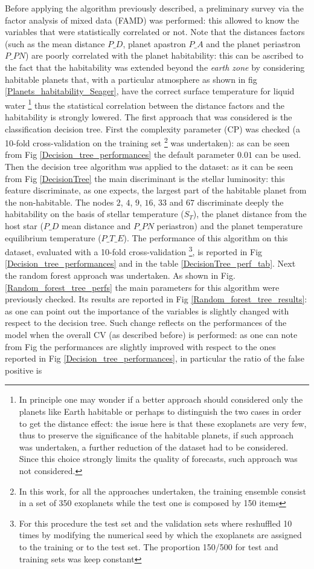 \documentclass[
12pt, %
a4paper, %
oneside, %
headinclude,footinclude, %
BCOR5mm, %
]{scrartcl}
\begin{document}
Before applying the algorithm previously described, a preliminary survey via the factor analysis of mixed data (FAMD) was performed: this allowed to know the variables that were statistically correlated or not. Note that the distances  factors (such as the mean distance $P\_D$, planet apastron $P\_A$ and the planet periastron $P\_PN$) are poorly correlated with the planet habitability: this can be ascribed to the fact that the habitability was extended beyond the \textit{earth zone} by considering habitable planets that, with a particular atmosphere as shown in fig \ref{Planets_habitability_Seager}, have the correct surface temperature for liquid water
\footnote{In principle one may wonder if a better approach should considered only the planets like Earth habitable or perhaps to distinguish the two cases in order to get the distance effect: the issue here is that these exoplanets are very few, thus to preserve the significance of the habitable planets, if such approach was undertaken, a further reduction of the dataset had to be considered. Since this choice strongly limits the quality of forecasts, such approach was not considered.} thus the statistical correlation between the distance factors and the habitability is strongly lowered. The first approach that was considered is the classification decision tree. First the complexity parameter (CP) was checked (a 10-fold cross-validation on the training set \footnote{In this work, for all the approaches undertaken, the training ensemble consist in a set of 350 exoplanets while the test one is composed by 150 items} was undertaken): as can be seen from Fig \ref{Decision_tree_performances} the default parameter $0.01$ can be used. Then the decision tree algorithm was applied to the dataset: as it can be seen from Fig \ref{DecisionTree} the main discriminant is the stellar luminosity: this feature discriminate, as one expects, the largest part of the habitable planet from the non-habitable. The nodes $2$, $4$, $9$, $16$, $33$ and $67$ discriminate deeply the habitability on the basis of stellar temperature ($S_T$), the planet distance from the host star ($P\_D$ mean distance and $P\_PN$ periastron) and the planet temperature equilibrium temperature ($P\_T\_E$). The performance of this algorithm on this dataset, evaluated with a 10-fold cross-validation \footnote{For this procedure the test set and the validation sets where reshuffled 10 times by modifying the numerical seed by which the exoplanets are assigned to the training or to the test set. The proportion 150/500 for test and training sets was keep constant}, is reported in Fig \ref{Decision_tree_performances} and in the table \ref{DecisionTree_perf_tab}. Next the random forest approach was undertaken. As shown in Fig. \ref{Random_forest_tree_perfs} the main parameters for this algorithm were previously checked. Its results are reported in Fig \ref{Random_forest_tree_results}: as one can point out the importance of the variables is slightly changed with respect to the decision tree. Such change reflects on the performances of the model when the overall CV (as described before) is performed: as one can note from Fig the performances are slightly improved with respect to the ones reported in Fig \ref{Decision_tree_performances}, in particular the ratio of the false positive is 
\end{document}
